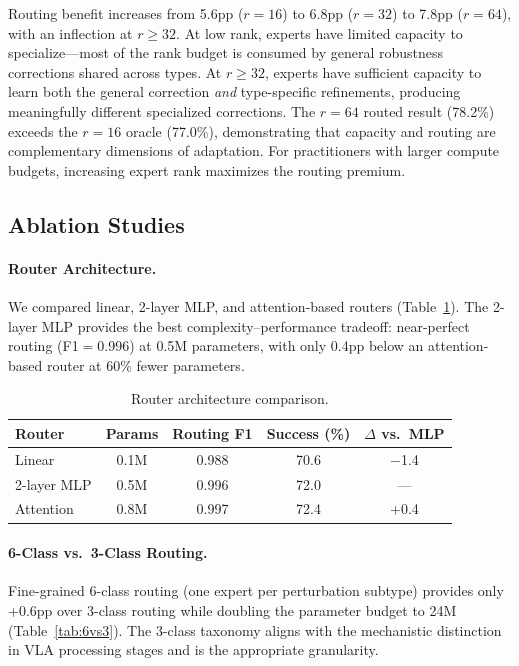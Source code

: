 \documentclass[10pt,twocolumn]{article}
\begin{document}
Routing benefit increases from 5.6pp ($r{=}16$) to 6.8pp ($r{=}32$) to 7.8pp ($r{=}64$), with an inflection at $r{\geq}32$.
At low rank, experts have limited capacity to specialize---most of the rank budget is consumed by general robustness corrections shared across types.
At $r{\geq}32$, experts have sufficient capacity to learn both the general correction \emph{and} type-specific refinements, producing meaningfully different specialized corrections.
The $r{=}64$ routed result (78.2\%) exceeds the $r{=}16$ oracle (77.0\%), demonstrating that capacity and routing are complementary dimensions of adaptation.
For practitioners with larger compute budgets, increasing expert rank maximizes the routing premium.

\subsection{Ablation Studies}
\label{sec:ablations}

\paragraph{Router Architecture.}
We compared linear, 2-layer MLP, and attention-based routers (Table~\ref{tab:router_arch}).
The 2-layer MLP provides the best complexity--performance tradeoff: near-perfect routing (F1$=$0.996) at 0.5M parameters, with only 0.4pp below an attention-based router at 60\% fewer parameters.

\begin{table}[h]
\centering
\caption{Router architecture comparison.}
\label{tab:router_arch}
\small
\begin{tabular}{lcccc}
\toprule
Router & Params & Routing F1 & Success (\%) & $\Delta$ vs.\ MLP \\
\midrule
Linear & 0.1M & 0.988 & 70.6 & $-$1.4 \\
2-layer MLP & 0.5M & 0.996 & 72.0 & --- \\
Attention & 0.8M & 0.997 & 72.4 & +0.4 \\
\bottomrule
\end{tabular}
\end{table}

\paragraph{6-Class vs.\ 3-Class Routing.}
Fine-grained 6-class routing (one expert per perturbation subtype) provides only +0.6pp over 3-class routing while doubling the parameter budget to 24M (Table~\ref{tab:6vs3}).
The 3-class taxonomy aligns with the mechanistic distinction in VLA processing stages and is the appropriate granularity.
\end{document}
